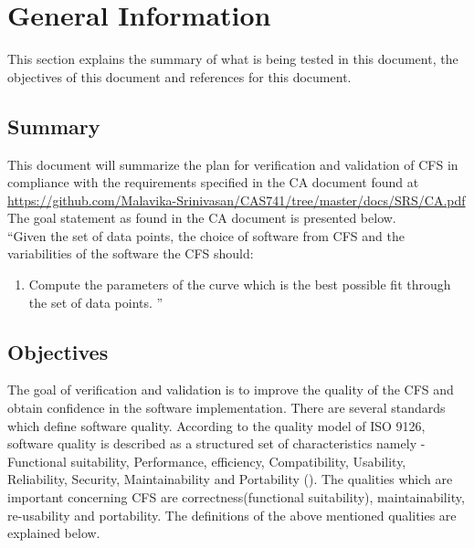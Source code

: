 \documentclass[12pt, titlepage]{article}
\newcommand{\famname}{CFS} %
\begin{document}
\section{General Information}

This section explains the summary of what is being tested in this document, the objectives of this document and references for this document. 


\subsection{Summary}

This document will summarize the plan for verification and validation of
\famname{} in compliance with the requirements specified in the CA document
found at
\url{https://github.com/Malavika-Srinivasan/CAS741/tree/master/docs/SRS/CA.pdf}
The goal statement as found in the CA document is presented below.\\
\noindent ``Given the set of data points, the choice of software from \famname{} and the variabilities of the software the \famname{} should:

\begin{enumerate}
	
	\item Compute the parameters of the curve which is the best possible fit through the set of data points.	''
\end{enumerate}


\subsection{Objectives}

The goal of verification and validation is to improve the quality of the
\famname{} and obtain confidence
in the software implementation. There are several standards which define
software quality. According to the quality model of ISO 9126, software quality
is described as a structured set of characteristics namely - Functional
suitability, Performance, efficiency, Compatibility, Usability, Reliability,
Security, Maintainability and Portability (\cite{ISO9126}). The qualities which
are important concerning \famname{} are correctness(functional suitability),
maintainability, re-usability and portability. The definitions of the above
mentioned qualities are explained below.
\end{document}
